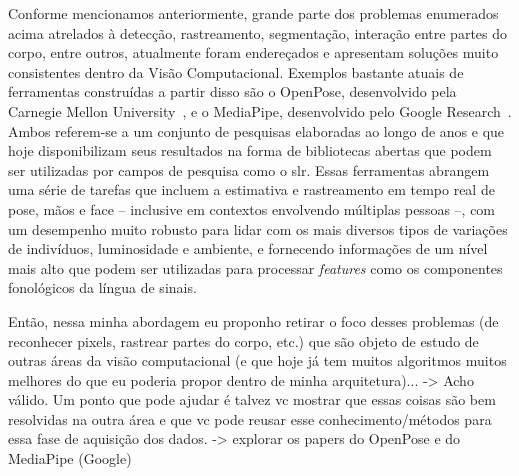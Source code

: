 Conforme mencionamos anteriormente, grande parte dos problemas enumerados acima atrelados à detecção, rastreamento, segmentação, interação entre partes do corpo, entre outros, atualmente foram endereçados e apresentam soluções muito consistentes dentro da Visão Computacional. 
Exemplos bastante atuais de ferramentas construídas a partir disso são o OpenPose, desenvolvido pela Carnegie Mellon University~\cite{wei-2016-conv-machines-openpose,cao-2017-openpose,simon-2017-openpose-hand-face}, e o MediaPipe, desenvolvido pelo Google Research~\cite{lugaresi-2019-mediapipe,bazarevsky-2019-mediapipe-blazeface,vakunov-2020-mediapipe-hands,bazarevsky-2020-mediapipe-blazepose}. Ambos referem-se a um conjunto de pesquisas elaboradas ao longo de anos e que hoje disponibilizam seus resultados na forma de bibliotecas abertas que podem ser utilizadas por campos de pesquisa como o \acrshort{slr}.
Essas ferramentas abrangem uma série de tarefas que incluem a estimativa e rastreamento em tempo real de pose, mãos e face -- inclusive em contextos envolvendo múltiplas pessoas --, com um desempenho muito robusto para lidar com os mais diversos tipos de variações de indivíduos, luminosidade e ambiente, 
e fornecendo informações de um nível mais alto que podem ser utilizadas para processar \textit{features} como os componentes fonológicos da língua de sinais.



    
        Então, nessa minha abordagem eu proponho retirar o foco desses problemas (de reconhecer pixels, rastrear partes do corpo, etc.) que são objeto de estudo de outras áreas da visão computacional (e que hoje já tem muitos algoritmos muitos melhores do que eu poderia propor dentro de minha arquitetura)...
            -> Acho válido. Um ponto que pode ajudar é talvez vc mostrar que essas coisas são bem resolvidas na outra área e que vc pode reusar esse conhecimento/métodos para essa fase de aquisição dos dados.
                -> explorar os papers do OpenPose e do MediaPipe (Google)


